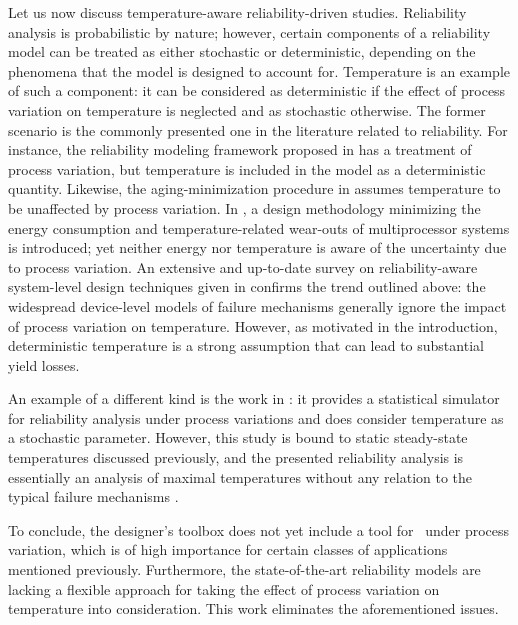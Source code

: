 Let us now discuss temperature-aware reliability-driven studies.
Reliability analysis is probabilistic by nature; however, certain components of a reliability model can be treated as either stochastic or deterministic, depending on the phenomena that the model is designed to account for.
Temperature is an example of such a component: it can be considered as deterministic if the effect of process variation on temperature is neglected and as stochastic otherwise.
The former scenario is the commonly presented one in the literature related to reliability.
For instance, the reliability modeling framework proposed in \cite{xiang2010} has a treatment of process variation, but temperature is included in the model as a deterministic quantity.
Likewise, the aging-minimization procedure in \cite{ukhov2012} assumes temperature to be unaffected by process variation.
In \cite{das2014a}, a design methodology minimizing the energy consumption and temperature-related wear-outs of multiprocessor systems is introduced; yet neither energy nor temperature is aware of the uncertainty due to process variation.
An extensive and up-to-date survey on reliability-aware system-level design techniques given in \cite{das2014b} confirms the trend outlined above: the widespread device-level models of failure mechanisms generally ignore the impact of process variation on temperature.
However, as motivated in the introduction, deterministic temperature is a strong assumption that can lead to substantial yield losses.

An example of a different kind is the work in \cite{lee2013}: it provides a statistical simulator for reliability analysis under process variations and does consider temperature as a stochastic parameter.
However, this study is bound to static steady-state temperatures discussed previously, and the presented reliability analysis is essentially an analysis of maximal temperatures without any relation to the typical failure mechanisms \cite{jedec}.

To conclude, the designer's toolbox does not yet include a tool for \dssta\ under process variation, which is of high importance for certain classes of applications mentioned previously.
Furthermore, the state-of-the-art reliability models are lacking a flexible approach for taking the effect of process variation on temperature into consideration.
This work eliminates the aforementioned issues.
